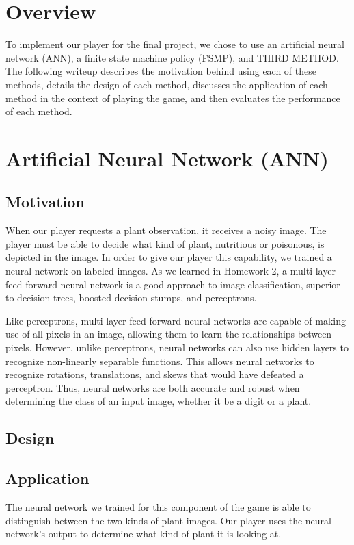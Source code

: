 \documentclass[solution, letterpaper]{cs121}
\begin{document}


\section{Overview}
To implement our player for the final project, we chose to use an artificial neural network (ANN), a finite state machine policy (FSMP), and THIRD METHOD. The following writeup describes the motivation behind using each of these methods, details the design of each method, discusses the application of each method in the context of playing the game, and then evaluates the performance of each method. 

\section{Artificial Neural Network (ANN)}
\subsection{Motivation}
When our player requests a plant observation, it receives a noisy image. The player must be able to decide what kind of plant, nutritious or poisonous, is depicted in the image. In order to give our player this capability, we trained a neural network on labeled images. As we learned in Homework 2, a multi-layer feed-forward neural network is a good approach to image classification, superior to decision trees, boosted decision stumps, and perceptrons. 

Like perceptrons, multi-layer feed-forward neural networks are capable of making use of all pixels in an image, allowing them to learn the relationships between pixels. However, unlike perceptrons, neural networks can also use hidden layers to recognize non-linearly separable functions. This allows neural networks to recognize rotations, translations, and skews that would have defeated a perceptron. Thus, neural networks are both accurate and robust when determining the class of an input image, whether it be a digit or a plant.

\subsection{Design}

\subsection{Application}
The neural network we trained for this component of the game is able to distinguish between the two kinds of plant images. Our player uses the neural network's output to determine what kind of plant it is looking at.
\end{document}
